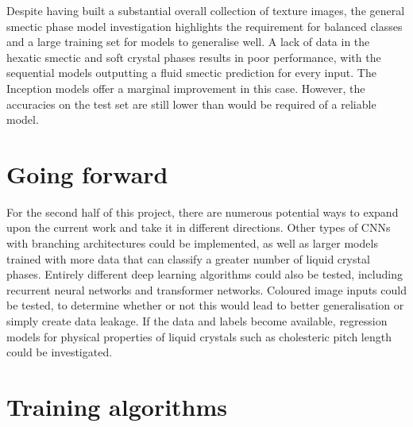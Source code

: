 \documentclass[12pt]{article}
\begin{document}
Despite having built a substantial overall collection of texture images, the general smectic phase model investigation highlights the requirement for balanced classes and a large training set for models to generalise well. A lack of data in the hexatic smectic and soft crystal phases results in poor performance, with the sequential models outputting a fluid smectic prediction for every input. The Inception models offer a marginal improvement in this case. However, the accuracies on the test set are still lower than would be required of a reliable model.
\section{Going forward}
For the second half of this project, there are numerous potential ways to expand upon the current work and take it in different directions. Other types of CNNs with branching architectures could be implemented, as well as larger models trained with more data that can classify a greater number of liquid crystal phases. Entirely different deep learning algorithms could also be tested, including recurrent neural networks and transformer networks. Coloured image inputs could be tested, to determine whether or not this would lead to better generalisation or simply create data leakage. If the data and labels become available, regression models for physical properties of liquid crystals such as cholesteric pitch length could be investigated.



\appendix
\appendixpage
\section{Training algorithms}
\end{document}
